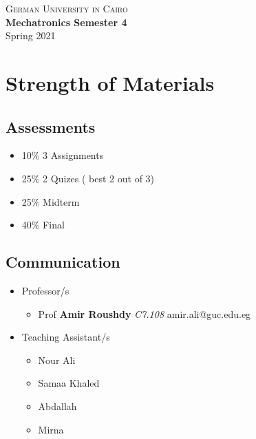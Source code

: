 \documentclass[11pt]{article}
\begin{document}
\setcounter{section}{0}
\thispagestyle{empty}
\pagestyle{fancy}
\fancyhf{}

\begin{center}
\textsc{\LARGE German University in Cairo}\\[0.5cm]
{\LARGE \bf Mechatronics Semester 4}\\ [0.5cm]
Spring 2021
\end{center}
\setlength{\linewidth}{15cm}
\section{Strength of Materials}
\begin{multicols}{2}
\subsection{Assessments}
\begin{itemize}
	\item 10\% 3 Assignments
\item 25\% 2 Quizes ( best 2 out of 3)
\item 25\% Midterm
\item 40\% Final
\end{itemize}
\subsection{Communication}
\begin{itemize}

\item Professor/s 
\begin{itemize}

	\item Prof \textbf{Amir Roushdy} \textit{C7.108} amir.ali@guc.edu.eg  

\end{itemize}
\item Teaching Assistant/s
\begin{itemize}

\item Nour Ali
\item Samaa Khaled
\item Abdallah 
\item Mirna 
\end{itemize}
\end{itemize}
\end{multicols}
\end{document}
